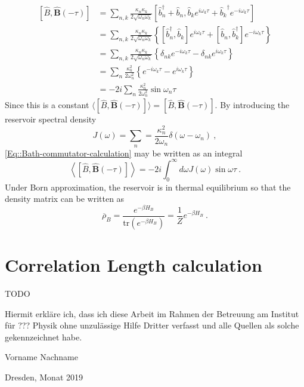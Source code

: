 	\begin{equation} \label{Eq::Bath-commutator-calculation}
		\begin{split}
			\left[\hat{B}, \boldsymbol{\hat{B}}(-\tau) \right] &=	\sum_{n,k}^{} \frac{\kappa_n \kappa_k}{2 \sqrt{\omega_n \omega_k}} \left[\hat{b}_n^\dagger + \hat{b}_n , {\hat{b}_k}e^{i \omega_k \tau} + {\hat{b}_k}^\dagger e^{-i \omega_k \tau} \right] \\
			&= \sum_{n,k}^{} \frac{\kappa_n \kappa_k}{2 \sqrt{\omega_n \omega_k}} \left\{\left[\hat{b}_n^\dagger, \hat{b}_k\right] e^{i\omega_k \tau} + \left[\hat{b}_n, \hat{b}_k^\dagger\right] e^{-i\omega_k \tau}\right\} \\
			&= \sum_{n,k}^{} \frac{\kappa_n \kappa_k}{2 \sqrt{\omega_n \omega_k}} \left\{\delta_{nk} e^{-i\omega_k \tau} - \delta_{nk} e^{i\omega_k \tau}\right\} \\
			&= \sum_{n}^{} \frac{\kappa_n^2 }{2 {\omega_n^2}} \left\{e^{-i\omega_k \tau} - e^{i\omega_k \tau}\right\} \\
			&= - 2 i  \sum_{n}^{} \frac{\kappa_n^2 }{2 {\omega_n^2}} \sin \omega_n \tau 
		\end{split}
	\end{equation}
	Since this is a constant $\langle [\hat{B}, \boldsymbol{\hat{B}}(-\tau) ]  \rangle =	[\hat{B}, \boldsymbol{\hat{B}}(-\tau) ]$. By introducing the reservoir spectral density 
	\begin{equation}
		J(\omega) =	\sum_n =	\frac{\kappa_n^2}{2 \omega_n} \delta(\omega - \omega_n)~,
	\end{equation}
	\autoref{Eq::Bath-commutator-calculation} may be written as an integral
	\begin{equation}
		\left\langle \left[\hat{B}, \boldsymbol{\hat{B}}(-\tau) \right] \right \rangle = -2i \int_{0}^{\infty} d\omega J(\omega) \sin \omega \tau~.
	\end{equation}
	Under Born approximation, the reservoir is in thermal equilibrium so that the density matrix can be written as
	\begin{equation}
		\overline{\rho}_B =	\frac{e^{-\beta H_B}}{\text{tr}\left(e^{-\beta H_B}\right)}=\frac{1}{Z} e^{-\beta H_B}~.
	\end{equation}
	\section{Correlation Length calculation} \label{Section::Corr-Lenght-Calculation}
	TODO
	
	
	
\clearpage
\thispagestyle{empty}
\vspace*{1.5em}

Hiermit erkläre ich, dass ich diese Arbeit im Rahmen der Betreuung am Institut
für ??? Physik ohne unzulässige Hilfe Dritter verfasst und alle Quellen als solche gekennzeichnet habe.

\vspace*{45em}

Vorname Nachname \par
Dresden, Monat 2019


